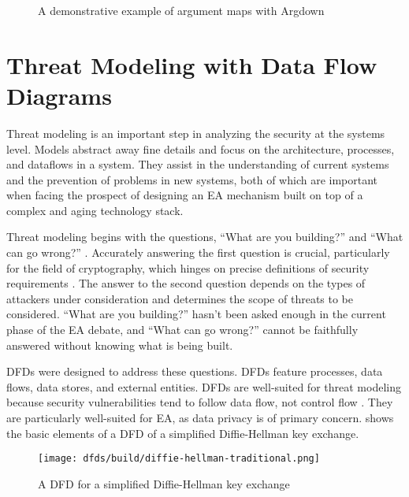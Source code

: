 \begin{figure}[h]
    \centering\CaptionFontSize
    \caption{A demonstrative example of argument maps with Argdown}
    \label{fig-args-key}
\end{figure}


\section{Threat Modeling with Data Flow Diagrams}
\label{sec-threat-model-intro}

Threat modeling is an important step in analyzing the security at the systems level. Models abstract away fine details
and focus on the architecture, processes, and dataflows in a system. They assist in the understanding of current systems
and the prevention of problems in new systems, both of which are important when facing the prospect of designing an
\ac{EA} mechanism built on top of a complex and aging technology stack.

Threat modeling begins with the questions, ``What are you building?'' and ``What can go wrong?''
\cite{shostack_threat_2014}. Accurately answering the first question is crucial, particularly for the field of
cryptography, which hinges on precise definitions of security requirements \cite{varia_2018}. The answer to the second
question depends on the types of attackers under consideration and determines the scope of threats to be considered.
``What are you building?'' hasn't been asked enough in the current phase of the \ac{EA} debate, and ``What can go
wrong?'' cannot be faithfully answered without knowing what is being built.

\Acp{DFD} were designed to address these questions. \Acp{DFD} feature processes, data flows, data stores, and external
entities. \Acp{DFD} are well-suited for threat modeling because security vulnerabilities tend to follow data flow, not
control flow \cite{shostack_threat_2014}. They are particularly well-suited for \ac{EA}, as data privacy is of primary
concern.  shows the basic elements of a \ac{DFD} of a simplified Diffie-Hellman key
exchange.

\begin{figure}[h]
    \centering\CaptionFontSize
    \texttt{[image: dfds/build/diffie-hellman-traditional.png]}
    \caption{A \acs{DFD} for a simplified Diffie-Hellman key exchange}
    \label{fig-dfd-dh-traditional}
\end{figure}

